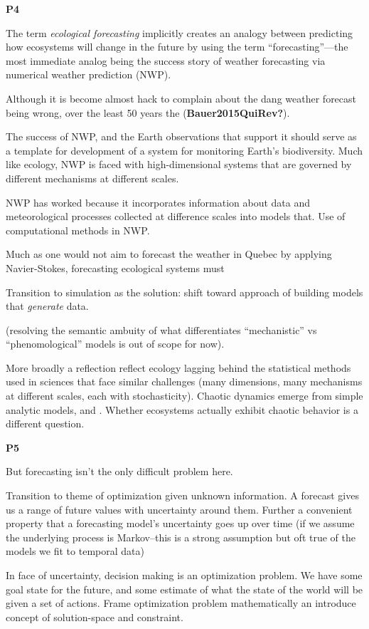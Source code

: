 \documentclass[10pt,oneside]{article}
\begin{document}
\textbf{P4}

The term \emph{ecological forecasting} implicitly creates an analogy
between predicting how ecosystems will change in the future by using the
term ``forecasting''---the most immediate analog being the success story
of weather forecasting via numerical weather prediction (NWP).

Although it is become almost hack to complain about the dang weather
forecast being wrong, over the least 50 years the
(\textbf{Bauer2015QuiRev?}).

The success of NWP, and the Earth observations that support it should
serve as a template for development of a system for monitoring Earth's
biodiversity. Much like ecology, NWP is faced with high-dimensional
systems that are governed by different mechanisms at different scales.

NWP has worked because it incorporates information about data and
meteorological processes collected at difference scales into models
that. Use of computational methods in NWP.

Much as one would not aim to forecast the weather in Quebec by applying
Navier-Stokes, forecasting ecological systems must

Transition to simulation as the solution: shift toward approach of
building models that \emph{generate} data.

(resolving the semantic ambuity of what differentiates ``mechanistic''
vs ``phenomological'' models is out of scope for now).

More broadly a reflection reflect ecology lagging behind the statistical
methods used in sciences that face similar challenges (many dimensions,
many mechanisms at different scales, each with stochasticity). Chaotic
dynamics emerge from simple analytic models, and . Whether ecosystems
actually exhibit chaotic behavior is a different question.

\textbf{P5}

But forecasting isn't the only difficult problem here.

Transition to theme of optimization given unknown information. A
forecast gives us a range of future values with uncertainty around them.
Further a convenient property that a forecasting model's uncertainty
goes up over time (if we assume the underlying process is Markov--this
is a strong assumption but oft true of the models we fit to temporal
data)

In face of uncertainty, decision making is an optimization problem. We
have some goal state for the future, and some estimate of what the state
of the world will be given a set of actions. Frame optimization problem
mathematically an introduce concept of solution-space and constraint.
\end{document}
